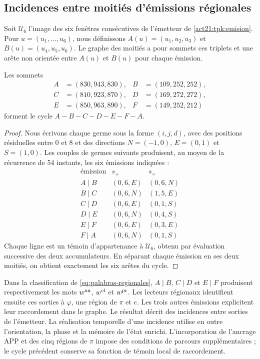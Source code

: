 \subsection{Incidences entre moitiés d'émissions régionales}
\label{sec:rec27-empalmes}

Soit $\mathcal U_6$ l'image des six fenêtres consécutives de l'émetteur de \ref{act21:tpk:emision}. Pour $u=(u_1,\ldots,u_6)$, nous définissons $A(u)=(u_1,u_2,u_3)$ et $B(u)=(u_4,u_5,u_6)$. Le graphe des moitiés a pour sommets ces triplets et une arête non orientée entre $A(u)$ et $B(u)$ pour chaque émission.

\begin{proposition}
Les sommets
\[
\begin{aligned}
A&=(830,943,830),&B&=(109,252,252),\\
C&=(810,923,870),&D&=(169,272,272),\\
E&=(850,963,890),&F&=(149,252,212)
\end{aligned}
\]
forment le cycle $A-B-C-D-E-F-A$.
\end{proposition}
\begin{proof}
Nous écrivons chaque germe sous la forme $(i,j,d)$, avec des positions résiduelles entre
$0$ et $8$ et des directions $N=(-1,0)$, $E=(0,1)$ et $S=(1,0)$.
Les couples de germes suivants produisent, au moyen de la récurrence de
54 instants, les six émissions indiquées :
\[
\begin{array}{c|c|c}
\text{émission}&s_+&s_\times\\\hline
A\mid B&(0,6,E)&(0,6,N)\\
B\mid C&(0,6,N)&(1,5,E)\\
C\mid D&(0,6,E)&(0,1,S)\\
D\mid E&(0,6,N)&(0,4,S)\\
E\mid F&(0,6,E)&(0,3,E)\\
F\mid A&(0,6,N)&(0,1,S)
\end{array}
\]
Chaque ligne est un témoin d'appartenance à $\mathcal U_6$, obtenu par
évaluation successive des deux accumulateurs. En séparant chaque émission en
ses deux moitiés, on obtient exactement les six arêtes du cycle.
\end{proof}

Dans la classification de \eqref{eq:palabras-regionales}, \(A\mid B\), \(C\mid D\) et \(E\mid F\) produisent respectivement les mots \(w^{\rm au}\), \(w^{\rm cl}\) et \(w^{\rm pr}\). Les lecteurs régionaux identifient ensuite ces sorties à \(\varphi\), une région de \(\pi\) et \(e\). Les trois autres émissions explicitent leur raccordement dans le graphe. Le résultat décrit des incidences entre sorties de l'émetteur. La réalisation temporelle d'une incidence utilise en outre l'orientation, la phase et la mémoire de l'état enrichi. L'incorporation de l'ancrage APP et des cinq régions de $\pi$ impose des conditions de parcours supplémentaires ; le cycle précédent conserve sa fonction de témoin local de raccordement.

